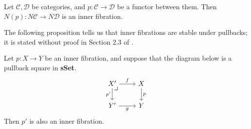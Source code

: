 \documentclass{MetricNotes2023}
\begin{document}
\begin{example}\label{ex:inner}
Let \(\mathcal{C}, \mathcal{D}\) be categories, and \(p : \mathcal{C} \to \mathcal{D}\) be a functor between them. Then \(N(p) : N \mathcal{C} \to N \mathcal{D}\) is an inner fibration.
\end{example}

The following proposition tells us that inner fibrations are stable under pullbacks; it is stated without proof in Section 2.3 of \autocite{lurie2008higher}.

\begin{proposition}\label{pullback}
Let \(p : X \to Y\) be an inner fibration, and suppose that the diagram below is a pullback square in \textbf{sSet}.
\[\begin{tikzcd}
X' \arrow[r, "f"] \arrow[d, swap, "p'"] \arrow[dr, phantom, "\scalebox{1.3}{$\lrcorner$}" {xshift=-16pt, yshift=10pt}] & X \arrow[d, "p"]  \\
Y' \arrow[r, swap, "g"]  & Y
\end{tikzcd}\]
Then \(p'\) is also an inner fibration. 
\end{proposition}
\end{document}
